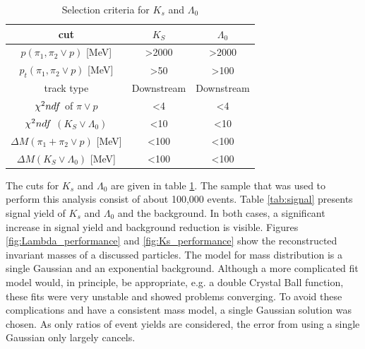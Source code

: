  
\begin{table}[h]
\caption{Selection criteria for $K_s$ and $\Lambda_0$ }
\hspace*{1.2cm}
\begin{tabular}{|c|c|c|}
\hline
cut                                      & $K_S$              & $\Lambda_0$        \\ \hline
$p(\pi_1, \pi_2 \lor p)$ {[}MeV{]}              & \textgreater{}2000 & \textgreater{}2000 \\ \hline
$p_t(\pi_1, \pi_2 \lor p)$ {[}MeV{]}            & \textgreater{}50   & \textgreater{}100  \\ \hline
track type                               & Downstream         & Downstream         \\ \hline
$\chi^2\/ndf$ of $\pi \lor p$              & \textless{}4       & \textless{}4       \\ \hline
$\chi^2\/ndf$ $(K_S \lor \Lambda_0)$       & \textless{}10      & \textless{}10      \\ \hline
$\Delta M(\pi_1 + \pi_2 \lor p)$ {[}MeV{]} & \textless{}100     & \textless{}100     \\ \hline
$\Delta M(K_S \lor \Lambda_0)$ {[}MeV{]}   & \textless{}100     & \textless{}100     \\ \hline
\end{tabular}
\label{tab:cuts}
\end{table}
 
 
 The cuts for $K_s$ and $\Lambda_0$ are given in table \ref{tab:cuts}. The sample that was used to perform this analysis consist of about 100,000 events. Table \ref{tab:signal} presents signal yield of $K_s$ and $\Lambda_0$ and the background. In both cases, a significant increase in signal yield and background reduction is visible. Figures \ref{fig:Lambda_performance} and \ref{fig:Ks_performance} show the reconstructed invariant masses of a discussed particles. The model for mass distribution is a single Gaussian and an exponential background. Although a more complicated fit model would, in principle, be appropriate, e.g. a double Crystal Ball function, these fits were very unstable and showed problems converging. To avoid these complications and have a consistent mass model, a single Gaussian solution was chosen. As only ratios of event yields are considered, the error from using a single Gaussian only largely cancels. 
 

